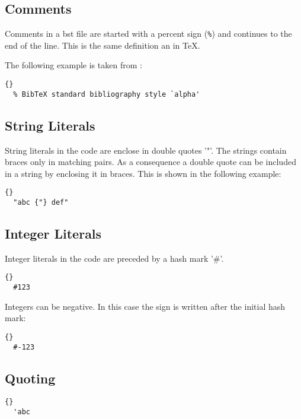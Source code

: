 \subsection{Comments}\label{sec:bst.comments}

Comments in a bst file are started with a percent sign (\verb|%|) and
continues to the end of the line. This is the same definition an in
\TeX{}.

The following example is taken from :

\begin{lstlisting}{}
  % BibTeX standard bibliography style `alpha'
\end{lstlisting}


\subsection{String Literals}\label{sec:bst.strings}

String literals in the code are enclose in double quotes '"'. The
strings contain braces only in matching pairs. As a consequence a
double quote can be included in a string by enclosing it in braces.
This is shown in the following example:

\begin{lstlisting}{}
  "abc {"} def"
\end{lstlisting}


\subsection{Integer Literals}\label{sec:bst.integers}

Integer literals in the code are preceded by a hash mark '\#'.

\begin{lstlisting}{}
  #123
\end{lstlisting}

Integers can be negative. In this case the sign is written after the
initial hash mark:

\begin{lstlisting}{}
  #-123
\end{lstlisting}


\subsection{Quoting}\label{sec:bst.quote}

\INCOMPLETE

\begin{lstlisting}{}
  'abc
\end{lstlisting}

